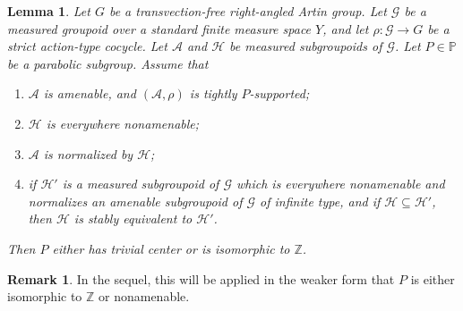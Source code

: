 \documentclass[JEP,XML,SOM,Unicode,NoFloatCountersInSection,published]{cedram}
\let\mathcal\mathscr
\theoremstyle{plain}
\newtheorem{lemma}[theo]{Lemma}
\theoremstyle{definition}
\newtheorem{rk}[theo]{Remark}
\newcommand{\cala}{\mathcal{A}}
\newcommand{\calg}{\mathcal{G}}
\newcommand{\calh}{\mathcal{H}}
\begin{document}
\begin{lemma}\label{lemma:amenable-normal-maximal}
Let $G$ be a transvection-free right-angled Artin group. Let $\calg$ be a measured groupoid over a standard finite measure space $Y$, and let $\rho:\calg\to G$ be a strict action-type cocycle. Let $\cala$ and $\calh$ be measured subgroupoids of $\calg$. Let $P\in\mathbb{P}$ be a parabolic subgroup. Assume that
\begin{enumerate}
\item $\cala$ is amenable, and $(\cala,\rho)$ is tightly $P$-supported;
\item $\calh$ is everywhere nonamenable;
\item $\cala$ is normalized by $\calh$;
\item if $\calh'$ is a measured subgroupoid of $\calg$ which is everywhere nonamenable and normalizes an amenable subgroupoid of $\calg$ of infinite type, and if $\calh\subseteq\calh'$, then $\calh$ is stably equivalent to $\calh'$.
\end{enumerate}
Then $P$ either has trivial center or is isomorphic to $\mathbb{Z}$.
\end{lemma}

\begin{rk}
In the sequel, this will be applied in the weaker form that $P$ is either isomorphic to $\mathbb{Z}$ or nonamenable.
\end{rk}
\end{document}
